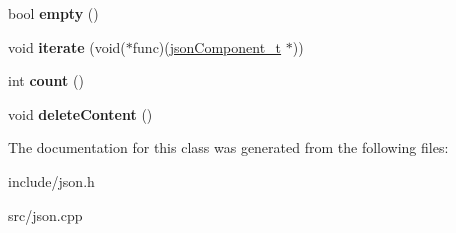 \begin{DoxyCompactItemize}
\item 
\hypertarget{classjsonArr__t_ab3e9275123c4eaa8f91ce9cc094fbcd7}{bool {\bfseries empty} ()}\label{classjsonArr__t_ab3e9275123c4eaa8f91ce9cc094fbcd7}

\item 
\hypertarget{classjsonArr__t_a6fd4099e411f9d79ede77cff376102a3}{void {\bfseries iterate} (void($\ast$func)(\hyperlink{classjsonComponent__t}{json\-Component\-\_\-t} $\ast$))}\label{classjsonArr__t_a6fd4099e411f9d79ede77cff376102a3}

\item 
\hypertarget{classjsonArr__t_ae16de3551fd050a4ec37b10ad2dd9a45}{int {\bfseries count} ()}\label{classjsonArr__t_ae16de3551fd050a4ec37b10ad2dd9a45}

\item 
\hypertarget{classjsonArr__t_a39941316121b888e8ca65658526eed8a}{void {\bfseries delete\-Content} ()}\label{classjsonArr__t_a39941316121b888e8ca65658526eed8a}

\end{DoxyCompactItemize}


\-The documentation for this class was generated from the following files\-:\begin{DoxyCompactItemize}
\item 
include/json.\-h\item 
src/json.\-cpp\end{DoxyCompactItemize}
